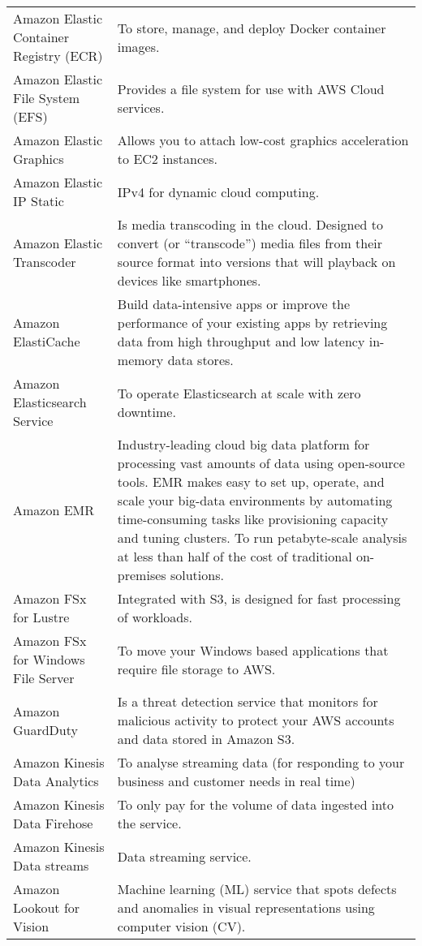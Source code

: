 \documentclass[]{book}
\begin{document}
\begin{table}
\begin{tabular}[t]{ll}
Amazon Elastic Container Registry (ECR) & To store, manage, and deploy Docker container images.\\
Amazon Elastic File System (EFS) & Provides a file system for use with AWS Cloud services.\\
\addlinespace
Amazon Elastic Graphics & Allows you to attach low-cost graphics acceleration to EC2 instances.\\
Amazon Elastic IP   Static & IPv4 for dynamic cloud computing.\\
Amazon Elastic Transcoder & Is media transcoding in the cloud. Designed to convert (or “transcode”) media files from their source format into versions that will playback on devices like smartphones.\\
Amazon ElastiCache & Build data-intensive apps or improve the performance of your existing apps by retrieving data from high throughput and low latency in-memory data stores.\\
Amazon Elasticsearch Service & To operate Elasticsearch at scale with zero downtime.\\
\addlinespace
Amazon EMR & Industry-leading cloud big data platform for processing vast amounts of data using open-source tools. EMR makes easy to set up, operate, and scale your big-data environments by automating time-consuming tasks like provisioning capacity and tuning clusters. To run petabyte-scale analysis at less than half of the cost of traditional on-premises solutions.\\
Amazon FSx for Lustre & Integrated with S3, is designed for fast processing of workloads.\\
Amazon FSx for Windows File Server & To move your Windows based applications that require file storage to AWS.\\
Amazon GuardDuty & Is a threat detection service that monitors for malicious activity to protect your AWS accounts and data stored in Amazon S3.\\
Amazon Kinesis Data Analytics & To analyse streaming data (for responding to your business and customer needs in real time)\\
\addlinespace
Amazon Kinesis Data Firehose & To only pay for the volume of data ingested into the service.\\
Amazon Kinesis Data streams & Data streaming service.\\
Amazon Lookout for Vision & Machine learning (ML) service that spots defects and anomalies in visual representations using computer vision (CV).\\

\end{tabular}
\end{table}
\end{document}
